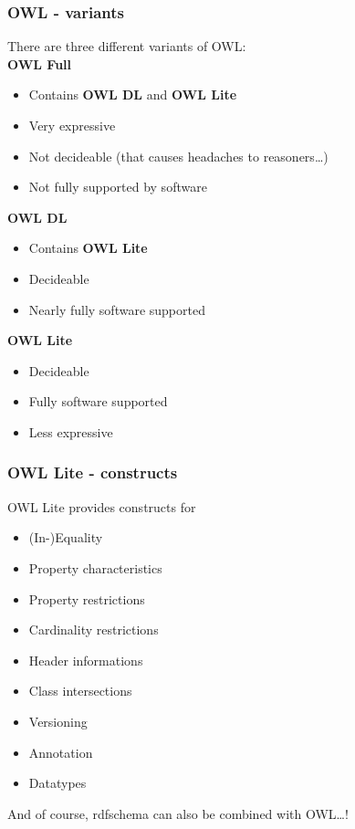 \documentclass{beamer}
\begin{document}
       \begin{frame}
           \frametitle{OWL - variants}

           There are three different variants of OWL:\\
           \pause
           \textbf{OWL Full}\\
           \begin{itemize}
               \item Contains \textbf{OWL DL} and \textbf{OWL Lite}
               \item Very expressive
               \item Not decideable (that causes headaches to reasoners\ldots)
               \item Not fully supported by software
           \end{itemize}
           \pause
           \textbf{OWL DL}
           \begin{itemize}
               \item Contains \textbf{OWL Lite}
               \item Decideable
               \item Nearly fully software supported
           \end{itemize}
           \pause
           \textbf{OWL Lite}
           \begin{itemize}
               \item Decideable
               \item Fully software supported
               \item Less expressive
           \end{itemize}
       \end{frame}

       \begin{frame}
           \frametitle{OWL Lite - constructs}

           OWL Lite provides constructs for
           \vskip 0.7cm
           \begin{itemize}           
               \item (In-)Equality
               \item Property characteristics
               \item Property restrictions
               \item Cardinality restrictions
               \item Header informations
               \item Class intersections
               \item Versioning
               \item Annotation
               \item Datatypes
           \end{itemize}
           \vskip 0.7cm
           And of course, rdfschema can also be combined with OWL\ldots!
       \end{frame}
\end{document}
